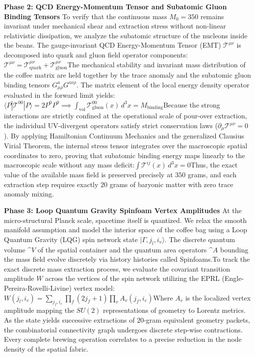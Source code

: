 \begin{enumerate}
 \textbf{Phase 2: QCD Energy-Momentum Tensor and Subatomic Gluon Binding Tensors} To verify that the continuous mass \(M_0 = 350\) remains invariant under mechanical shear and extraction stress without non-linear relativistic dissipation, we analyze the subatomic structure of the nucleons inside the beans. The gauge-invariant QCD Energy-Momentum Tensor (EMT) \(\mathcal{T}^{\mu \nu }\) is decomposed into quark and gluon field operator components:\(\mathcal{T}^{\mu \nu }=\mathcal{T}_{\text{quark}}^{\mu \nu }+\mathcal{T}_{\text{gluon}}^{\mu \nu }\)The mechanical stability and invariant mass distribution of the coffee matrix are held together by the trace anomaly and the subatomic gluon binding tensors \(G^a_{\mu\rho} G^{a\nu\rho}\). The matrix element of the local energy density operator evaluated in the forward limit yields:\(\langle P|{}\mathcal{T}^{00}|{}P\rangle =2P^{0}P^{0}\implies \int _{\text{vol}}\mathcal{T}_{\text{gluon}}^{00}(x)\,d^{3}x=M_{\text{binding}}\)Because the strong interactions are strictly confined at the operational scale of pour-over extraction, the individual UV-divergent operators satisfy strict conservation laws (\(\partial_\mu \mathcal{T}^{\mu\nu} = 0\)). By applying Hamiltonian Continuum Mechanics and the generalized Clausius Virial Theorem, the internal stress tensor integrates over the macroscopic spatial coordinates to zero, proving that subatomic binding energy maps linearly to the macroscopic scale without any mass deficit:\(\int \mathcal{T}^{ij}(x)\,d^{3}x=0\)Thus, the exact value of the available mass field is preserved precisely at \(350\) grams, and each extraction step requires exactly \(20\) grams of baryonic matter with zero trace anomaly mixing.

 \textbf{Phase 3: Loop Quantum Gravity Spinfoam Vertex Amplitudes} At the micro-structural Planck scale, spacetime itself is quantized. We relax the smooth manifold assumption and model the interior space of the coffee bag using a Loop Quantum Gravity (LQG) spin network state \(\vert{}\Gamma, j_l, i_v\rangle\). The discrete quantum volume \(\^{V}\) of the spatial container and the quantum area operators \(\^{A}\) bounding the mass field evolve discretely via history histories called Spinfoams.To track the exact discrete mass extraction process, we evaluate the covariant transition amplitude \(W\) across the vertices of the spin network utilizing the EPRL (Engle-Pereira-Rovelli-Livine) vertex model:\(W(j_{l},i_{v})=\sum _{j_{f},i_{e}}\prod _{f}(2j_{f}+1)\prod _{v}A_{v}(j_{f},i_{e})\)Where \(A_{v}\) is the localized vertex amplitude mapping the \(SU(2)\) representations of geometry to Lorentz metrics. As the state yields successive extractions of \(20\)-gram equivalent geometry packets, the combinatorial connectivity graph undergoes discrete step-wise contractions. Every complete brewing operation correlates to a precise reduction in the node density of the spatial fabric.


\end{enumerate}
